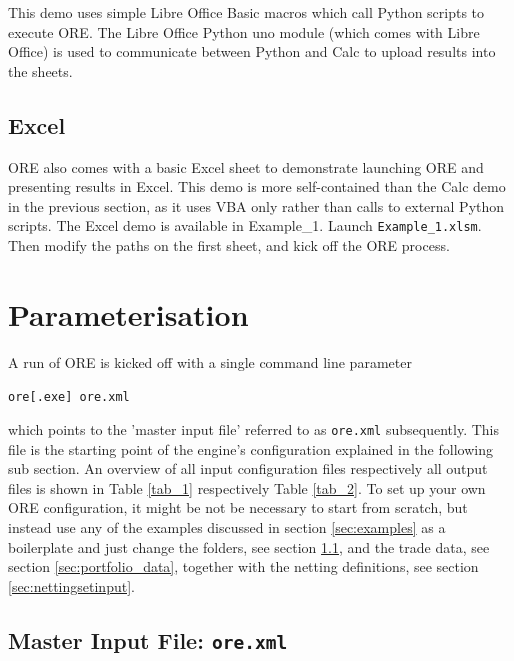 \documentclass[12pt, a4paper]{article}
\begin{document}
{This demo uses simple Libre Office Basic macros which call Python scripts to execute ORE. The Libre Office Python uno
module (which comes with Libre Office) is used to communicate between Python and Calc to upload results into the sheets.


\subsection{Excel}\label{sec:excel}

ORE also comes with a basic Excel sheet to demonstrate launching ORE and presenting results in Excel. This demo is more
self-contained than the Calc demo in the previous section, as it uses VBA only rather than calls to external Python
scripts. The Excel demo is available in Example\_1. Launch {\tt Example\_1.xlsm}. Then modify the paths on the first
sheet, and kick off the ORE process.

\section{Parameterisation}\label{sec:configuration}

A run of ORE is kicked off with a single command line parameter 

\medskip
\centerline{\tt ore[.exe] ore.xml}
\medskip

which points to the 'master input file' referred to  as {\tt ore.xml} subsequently. 
This file is the starting point of the engine's configuration explained in the following sub section.
An overview of all input configuration files respectively all output files is shown in Table \ref{tab_1} respectively Table \ref{tab_2}.
To set up your own ORE configuration, it might be not be necessary to start from scratch, but instead use any of the examples discussed in section \ref{sec:examples} as a boilerplate and just change the folders, see section \ref{sec:master_input}, and the trade data, see section \ref{sec:portfolio_data}, together with the netting definitions, see section \ref{sec:nettingsetinput}.

\subsection{Master Input File: {\tt ore.xml}}\label{sec:master_input}

}
\end{document}
